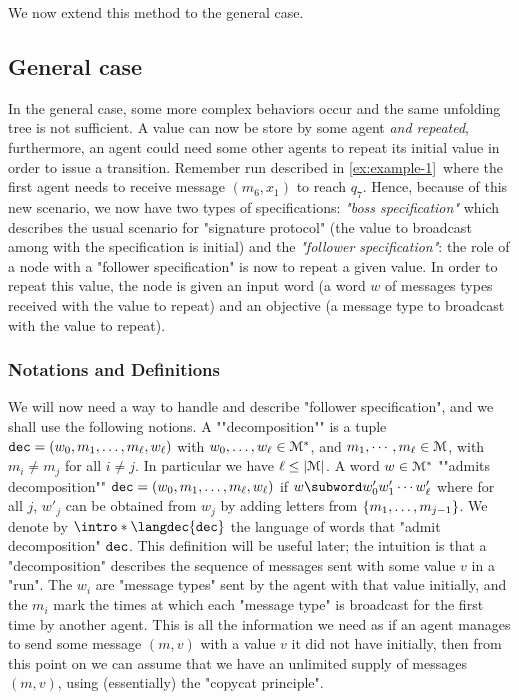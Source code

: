 We now extend this method to the general case. 


\subsection{General case}
In the general case, some more complex behaviors occur and the same unfolding tree is not sufficient. A value can now be store by some agent \emph{and repeated}, furthermore, an agent could need some other agents to repeat its initial value in order to issue a transition. Remember run described in \cref{ex:example-1}~where the first agent needs to receive message $(m_6, x_1)$ to reach $q_7$. Hence, because of this new scenario, we now have two types of specifications: \emph{"boss specification"} which describes the usual scenario for "signature protocol" (the value to broadcast among with the specification is initial) and the \emph{"follower specification"}: the role of a node with a "follower specification" is now to repeat a given value. In order to repeat this value, the node is given an input word (a word $w$ of messages types received with the value to repeat) and an objective (a message type to broadcast with the value to repeat).

\subsubsection{Notations and Definitions}
\label{sec:decidability-defs}

We will now need a way to handle and describe "follower specification", and we shall use the following notions.
A ""decomposition"" is a tuple $\mathtt{dec} = (w_0, m_1, \ldots, m_\ell, w_\ell)$ with $w_0, \ldots, w_\ell \in \mathcal{M}^*$, and $m_1, \cdots, m_\ell \in \mathcal{M}$, with $m_i \neq m_j$ for all $i\neq j$. In particular we have $\ell \leq |\mathcal{M}|$. 
A word $w \in \mathcal{M}^*$ ""admits decomposition"" $\mathtt{dec} = (w_0, m_1, \ldots, m_\ell, w_\ell)$ if $w \subword w'_0 w'_1 \cdots w'_\ell$ where for all $j$, $w'_j$ can be obtained from $w_j$ by adding letters from $\{m_1, \ldots, m_{j-1}\}$. 
We denote by $\intro*\langdec{\decsymb}$ the language of words that "admit decomposition" $\mathtt{dec}$. 
This definition will be useful later; the intuition is that a "decomposition" describes the sequence of messages sent with some value $v$ in a "run". The $w_i$ are "message types" sent by the agent with that value initially, and the $m_i$ mark the times at which each "message type" is broadcast for the first time by another agent. This is all the information we need as if an agent manages to send some message $(m,v)$ with a value $v$ it did not have initially, then from this point on we can assume that we have an unlimited supply of messages $(m,v)$, using (essentially) the "copycat principle".  

